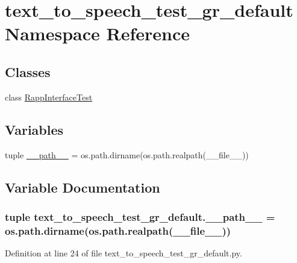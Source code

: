 \hypertarget{namespacetext__to__speech__test__gr__default}{\section{text\-\_\-to\-\_\-speech\-\_\-test\-\_\-gr\-\_\-default Namespace Reference}
\label{namespacetext__to__speech__test__gr__default}
}
\subsection*{Classes}
\begin{DoxyCompactItemize}
\item 
class \hyperlink{classtext__to__speech__test__gr__default_1_1RappInterfaceTest}{Rapp\-Interface\-Test}
\end{DoxyCompactItemize}
\subsection*{Variables}
\begin{DoxyCompactItemize}
\item 
tuple \hyperlink{namespacetext__to__speech__test__gr__default_a879028e50e69638d31190fbeb945e9d0}{\-\_\-\-\_\-path\-\_\-\-\_\-} = os.\-path.\-dirname(os.\-path.\-realpath(\-\_\-\-\_\-file\-\_\-\-\_\-))
\end{DoxyCompactItemize}


\subsection{Variable Documentation}
\hypertarget{namespacetext__to__speech__test__gr__default_a879028e50e69638d31190fbeb945e9d0}{
\subsubsection[{\-\_\-\-\_\-path\-\_\-\-\_\-}]{\setlength{\rightskip}{0pt plus 5cm}tuple text\-\_\-to\-\_\-speech\-\_\-test\-\_\-gr\-\_\-default.\-\_\-\-\_\-path\-\_\-\-\_\- = os.\-path.\-dirname(os.\-path.\-realpath(\-\_\-\-\_\-file\-\_\-\-\_\-))}}\label{namespacetext__to__speech__test__gr__default_a879028e50e69638d31190fbeb945e9d0}


Definition at line 24 of file text\-\_\-to\-\_\-speech\-\_\-test\-\_\-gr\-\_\-default.\-py.

